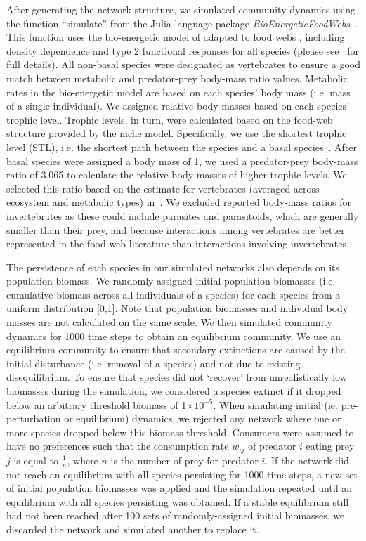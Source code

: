 \documentclass[12pt]{article}
\begin{document}
\begin{spacing}{1.0}
  
    		After generating the network structure, we simulated community dynamics using the function ``simulate'' from the Julia language package \emph{BioEnergeticFoodWebs}~\citep{bioenergeticfw,Delmas2017}. This function uses the bio-energetic model of \citet{Yodzis1992} adapted to food webs \citep{Williams2007}, including density dependence and type 2 functional responses for all species (please see~\citet{Delmas2017} for full details).
    		All non-basal species were designated as vertebrates to ensure a good match between metabolic and predator-prey body-mass ratio values. Metabolic rates in the bio-energetic model are based on each species' body mass (i.e. mass of a single individual). We assigned relative body masses based on each species' trophic level. Trophic levels, in turn, were calculated based on the food-web structure provided by the niche model. Specifically, we use the shortest trophic level (STL), i.e. the shortest path between the species and a basal species~\citep{Hairston1993}. After basal species were assigned a body mass of 1, we used a predator-prey body-mass ratio of 3.065 to calculate the relative body masses of higher trophic levels. We selected this ratio based on the estimate for vertebrates (averaged across ecosystem and metabolic types) in~\citet{Brose2006}. We excluded reported body-mass ratios for invertebrates as these could include parasites and parasitoids, which are generally smaller than their prey, and because interactions among vertebrates are better represented in the food-web literature than interactions involving invertebrates.
    		
    		
    		The persistence of each species in our simulated networks also depends on its population biomass. 
    		We randomly assigned initial population biomasses (i.e. cumulative biomass across all individuals of a species) for each species from a uniform distribution [0,1]. Note that population biomasses and individual body masses are not calculated on the same scale. We then simulated community dynamics for 1000 time steps to obtain an equilibrium community. We use an equilibrium community to ensure that secondary extinctions are caused by the initial disturbance (i.e. removal of a species) and not due to existing disequilibrium. To ensure that species did not `recover' from unrealistically low biomasses during the simulation, we considered a species extinct if it dropped below an arbitrary threshold biomass of 1$\times10^{-5}$. When simulating initial (ie. pre-perturbation or equilibrium) dynamics, we rejected any network where one or more species dropped below this biomass threshold. Consumers were assumed to have no preferences such that the consumption rate $w_{ij}$ of predator $i$ eating prey $j$ is equal to $\frac{1}{n}$, where $n$ is the number of prey for predator $i$. If the network did not reach an equilibrium with all species persisting for 1000 time steps, a new set of initial population biomasses was applied and the simulation repeated until an equilibrium with all species persisting was obtained.
    		If a stable equilibrium still had not been reached after 100 sets of randomly-assigned initial biomasses, we discarded the network and simulated another to replace it.
    

\end{spacing}
\end{document}
